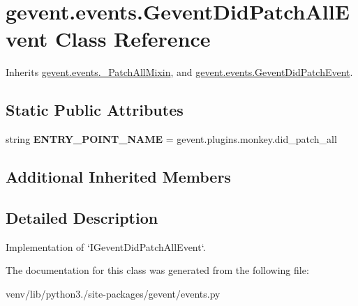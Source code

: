 \hypertarget{classgevent_1_1events_1_1_gevent_did_patch_all_event}{}\section{gevent.\+events.\+Gevent\+Did\+Patch\+All\+Event Class Reference}
\label{classgevent_1_1events_1_1_gevent_did_patch_all_event}


Inherits \hyperlink{classgevent_1_1events_1_1___patch_all_mixin}{gevent.\+events.\+\_\+\+Patch\+All\+Mixin}, and \hyperlink{classgevent_1_1events_1_1_gevent_did_patch_event}{gevent.\+events.\+Gevent\+Did\+Patch\+Event}.

\subsection*{Static Public Attributes}
\begin{DoxyCompactItemize}
\item 
\mbox{\label{classgevent_1_1events_1_1_gevent_did_patch_all_event_a3b69b0b1bd7be1f1684bc5eee5491910}} 
string {\bfseries E\+N\+T\+R\+Y\+\_\+\+P\+O\+I\+N\+T\+\_\+\+N\+A\+ME} = \textquotesingle{}gevent.\+plugins.\+monkey.\+did\+\_\+patch\+\_\+all\textquotesingle{}
\end{DoxyCompactItemize}
\subsection*{Additional Inherited Members}


\subsection{Detailed Description}
\begin{DoxyVerb}Implementation of `IGeventDidPatchAllEvent`.
\end{DoxyVerb}
 

The documentation for this class was generated from the following file\+:\begin{DoxyCompactItemize}
\item 
venv/lib/python3./site-\/packages/gevent/events.\+py\end{DoxyCompactItemize}

